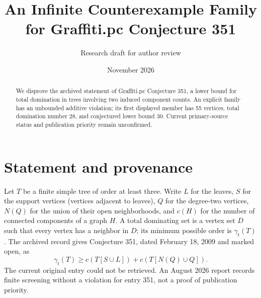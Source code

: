 \documentclass[11pt]{article}
\title{An Infinite Counterexample Family for Graffiti.pc Conjecture 351}
\author{Research draft for author review}
\date{November 2026}
\begin{document}
\maketitle
\begin{abstract}
We disprove the archived statement of Graffiti.pc Conjecture 351, a lower bound for total domination in trees involving two induced component counts. An explicit family has an unbounded additive violation; its first displayed member has 55 vertices, total domination number 28, and conjectured lower bound 30. Current primary-source status and publication priority remain unconfirmed.
\end{abstract}
\section{Statement and provenance}
Let $T$ be a finite simple tree of order at least three. Write $L$ for the leaves, $S$ for the support vertices (vertices adjacent to leaves), $Q$ for the degree-two vertices, $N(Q)$ for the union of their open neighborhoods, and $c(H)$ for the number of connected components of a graph $H$. A total dominating set is a vertex set $D$ such that every vertex has a neighbor in $D$; its minimum possible order is $\gamma_t(T)$. The archived record \cite{archive} gives Conjecture 351, dated February 18, 2009 and marked open, as
\[
 \gamma_t(T)\ge c(T[S\cup L])+c(T[N(Q)\cup Q]).
\]
The current original entry \cite{wow} could not be retrieved. An August 2026 report \cite{screen} records finite screening without a violation for entry 351, not a proof of publication priority.
\end{document}
